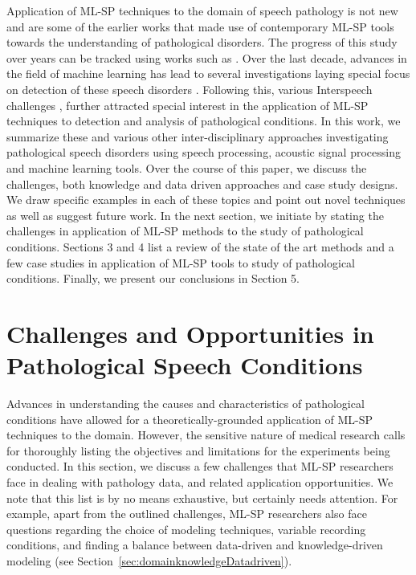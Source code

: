 \documentclass{article}
\begin{document}
Application of ML-SP techniques to the domain of speech pathology is not new and \cite{rees1973auditory,davis1979acoustic,robin1989auditory} are some of the earlier works that made use of contemporary ML-SP tools towards the understanding of pathological disorders. 
The progress of this study over years can be tracked using works such as \cite{hillenbrand1994acoustic,abberton1989laryngographic,manfredi2000adaptive}.
Over the last decade, advances in the field of machine learning has lead to several investigations laying special focus on detection of these speech disorders \cite{fonseca2007wavelet,chee2009mfcc}. Following this, various Interspeech challenges \cite{schuller2012interspeech,}, further attracted special interest in the application of ML-SP techniques to detection and analysis of pathological conditions.  
In this work, we summarize these and various other inter-disciplinary approaches investigating pathological speech disorders using speech processing, acoustic signal processing and machine learning tools.
Over the course of this paper, we discuss the challenges, both knowledge and data driven approaches and case study designs. 
We draw specific examples in each of these topics and point out novel techniques as well as suggest future work.
In the next section, we initiate by stating the challenges in application of ML-SP methods to the study of pathological conditions.
Sections 3 and 4 list a review of the state of the art methods and a few case studies in application of ML-SP tools to study of pathological conditions.
Finally, we present our conclusions in Section 5. 

\section{Challenges and Opportunities in Pathological Speech Conditions}
Advances in understanding the causes and characteristics of pathological conditions have allowed for a theoretically-grounded application of ML-SP techniques to the domain.
However, the sensitive nature of medical research calls for thoroughly listing the objectives and limitations for the experiments being conducted.
In this section, we discuss a few challenges that ML-SP researchers face in dealing with pathology data, and related application opportunities. We note that this list is by no means exhaustive, but certainly needs attention. For example, apart from the outlined challenges, ML-SP researchers also face questions regarding the choice of modeling techniques, variable recording conditions, and finding a balance between data-driven and knowledge-driven modeling (see Section~\ref{sec:domainknowledgeDatadriven}).
\end{document}
